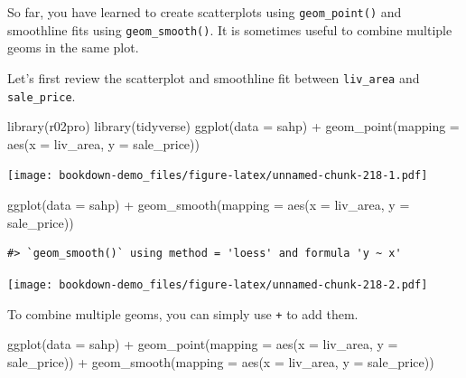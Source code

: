 \documentclass[
]{book}
\newenvironment{Shaded}{\begin{snugshade}}{\end{snugshade}}
\newcommand{\AttributeTok}[1]{\textcolor[rgb]{0.77,0.63,0.00}{#1}}
\newcommand{\FunctionTok}[1]{\textcolor[rgb]{0.00,0.00,0.00}{#1}}
\newcommand{\NormalTok}[1]{#1}
\newcommand{\SpecialCharTok}[1]{\textcolor[rgb]{0.00,0.00,0.00}{#1}}
\begin{document}
So far, you have learned to create scatterplots using \texttt{geom\_point()} and smoothline fits using \texttt{geom\_smooth()}. It is sometimes useful to combine multiple geoms in the same plot.

Let's first review the scatterplot and smoothline fit between \texttt{liv\_area} and \texttt{sale\_price}.

\begin{Shaded}
\begin{Highlighting}[]
\FunctionTok{library}\NormalTok{(r02pro)}
\FunctionTok{library}\NormalTok{(tidyverse)}
\FunctionTok{ggplot}\NormalTok{(}\AttributeTok{data =}\NormalTok{ sahp) }\SpecialCharTok{+} \FunctionTok{geom\_point}\NormalTok{(}\AttributeTok{mapping =} \FunctionTok{aes}\NormalTok{(}\AttributeTok{x =}\NormalTok{ liv\_area, }\AttributeTok{y =}\NormalTok{ sale\_price))}
\end{Highlighting}
\end{Shaded}

\texttt{[image: bookdown-demo\_files/figure-latex/unnamed-chunk-218-1.pdf]}

\begin{Shaded}
\begin{Highlighting}[]
\FunctionTok{ggplot}\NormalTok{(}\AttributeTok{data =}\NormalTok{ sahp) }\SpecialCharTok{+} \FunctionTok{geom\_smooth}\NormalTok{(}\AttributeTok{mapping =} \FunctionTok{aes}\NormalTok{(}\AttributeTok{x =}\NormalTok{ liv\_area, }\AttributeTok{y =}\NormalTok{ sale\_price))}
\end{Highlighting}
\end{Shaded}

\begin{verbatim}
#> `geom_smooth()` using method = 'loess' and formula 'y ~ x'
\end{verbatim}

\texttt{[image: bookdown-demo\_files/figure-latex/unnamed-chunk-218-2.pdf]}

To combine multiple geoms, you can simply use \texttt{+} to add them.

\begin{Shaded}
\begin{Highlighting}[]
\FunctionTok{ggplot}\NormalTok{(}\AttributeTok{data =}\NormalTok{ sahp) }\SpecialCharTok{+} \FunctionTok{geom\_point}\NormalTok{(}\AttributeTok{mapping =} \FunctionTok{aes}\NormalTok{(}\AttributeTok{x =}\NormalTok{ liv\_area, }\AttributeTok{y =}\NormalTok{ sale\_price)) }\SpecialCharTok{+} \FunctionTok{geom\_smooth}\NormalTok{(}\AttributeTok{mapping =} \FunctionTok{aes}\NormalTok{(}\AttributeTok{x =}\NormalTok{ liv\_area, }\AttributeTok{y =}\NormalTok{ sale\_price))}
\end{Highlighting}
\end{Shaded}
\end{document}
